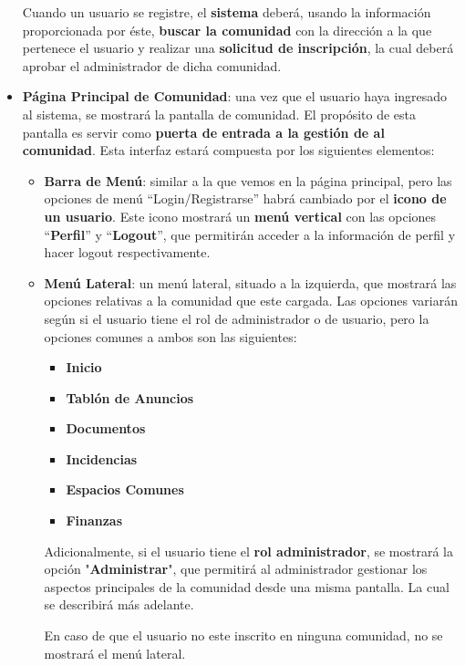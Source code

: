\begin{appendices}
\begin{itemize}
	Cuando un usuario se registre, el \textbf{sistema} deberá, usando la información proporcionada por éste, \textbf{buscar la comunidad} con la dirección a la que pertenece el usuario y realizar una \textbf{solicitud de inscripción}, la cual deberá aprobar el administrador de dicha comunidad. 

	
	\item \textbf{Página Principal de Comunidad}: una vez que el usuario haya ingresado al sistema, se mostrará la pantalla de comunidad. El propósito de esta pantalla es servir como \textbf{puerta de entrada a la gestión de al comunidad}. Esta interfaz estará compuesta por los siguientes elementos:
	
	\begin{itemize}
		\item \textbf{Barra de Menú}: similar a la que vemos en la página principal, pero las opciones de menú ``Login/Registrarse''  habrá cambiado por el \textbf{icono de un usuario}. Este icono mostrará un \textbf{menú vertical} con las opciones ``\textbf{Perfil}'' y ``\textbf{Logout}'', que permitirán acceder a la información de perfil y hacer \gls{logout} respectivamente.
		
		\item \textbf{Menú Lateral}: un menú lateral, situado a la izquierda, que mostrará las opciones relativas a la comunidad que este cargada. Las opciones variarán según si el usuario tiene el rol de administrador o de usuario, pero la opciones comunes a ambos son las siguientes: 
		
		\begin{itemize}
			\item \textbf{Inicio}
			\item \textbf{Tablón de Anuncios}
			\item \textbf{Documentos}
			\item \textbf{Incidencias}
			\item \textbf{Espacios Comunes}
			\item \textbf{Finanzas}
		\end{itemize}
	
		 
		 Adicionalmente, si el usuario tiene el \textbf{rol administrador}, se mostrará la opción "\textbf{Administrar}", que permitirá al administrador gestionar los aspectos principales de la comunidad desde una misma pantalla. La cual se describirá más adelante.
		 
		 En caso de que el usuario no este inscrito en ninguna comunidad, no se mostrará el menú lateral.
		

\end{itemize}
\end{itemize}
\end{appendices}
